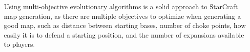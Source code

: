Using multi-objective evolutionary algorithms is a solid approach to StarCraft map generation, as there are multiple objectives to optimize when generating a good map, such as distance between starting bases, number of choke points, how easily it is to defend a starting position, and the number of expansions available to players.